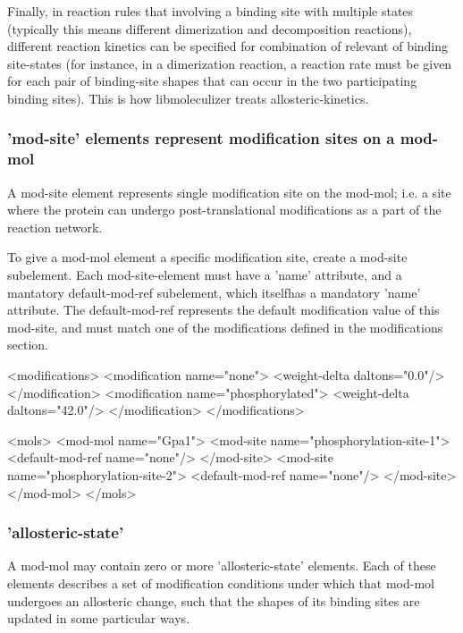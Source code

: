 Finally, in reaction rules that involving a binding site with multiple
states (typically this means different dimerization and decomposition
reactions), different reaction kinetics can be specified for
combination of relevant of binding site-states (for instance, in a dimerization
reaction, a reaction rate must be given for each pair of binding-site
shapes that can occur in the two participating binding sites).  This
is how libmoleculizer treats allosteric-kinetics.  

\subsubsection{'mod-site' elements represent modification sites on a
  mod-mol}
A mod-site element represents single modification site on the mod-mol;
i.e. a site where the protein can undergo post-translational 
modifications as a part of the reaction network.  

To give a mod-mol element a specific modification site, create a
mod-site subelement.  Each mod-site-element must have a 'name'
attribute, and a mantatory default-mod-ref subelement, which itselfhas
a mandatory 'name' attribute.  The default-mod-ref represents the
default modification value of this mod-site, and must match one of the
modifications defined in the modifications section.

\begin{ExampleXML}[caption=Defining a modification site in a mod-mol, label=modsiteexample]
<modifications>
  <modification name="none">
    <weight-delta daltons="0.0"/>
  </modification>
  <modification name="phosphorylated">
    <weight-delta daltons="42.0"/>
  </modification>
</modifications>

<mols>
  <mod-mol name="Gpa1">
    <mod-site name="phosphorylation-site-1">
      <default-mod-ref name="none"/>
    </mod-site>
    <mod-site name="phosphorylation-site-2">
      <default-mod-ref name="none"/>
    </mod-site>
  </mod-mol>
</mols>
\end{ExampleXML}

\subsubsection{'allosteric-state'}
A mod-mol may contain zero or more 'allosteric-state' elements. Each
of these elements describes a set of modification conditions under
which that mod-mol undergoes an allosteric change, such that the
shapes of its binding sites are updated in some particular ways.

